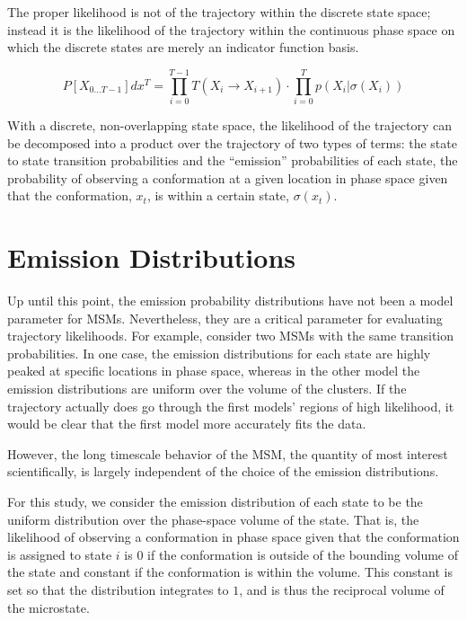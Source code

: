 \documentclass[twocolumn,floatfix,nofootinbib,aps]{revtex4-1}
\begin{document}
The proper likelihood is not of the trajectory within the discrete state
space; instead it is the likelihood of the trajectory within the
continuous phase space on which the discrete states are merely an
indicator function basis. 

\begin{equation}
P[X_{0...T-1}] dx^T = \prod_{i=0}^{T-1} T(X_i \rightarrow X_{i+1}) \cdot \prod_{i=0}^{T} p(X_{i} | \sigma(X_{i}))
\label{eq:like}
\end{equation}

With a discrete, non-overlapping state space, the likelihood of the
trajectory can be decomposed into a product over the trajectory of two
types of terms: the state to state transition probabilities and the
``emission'' probabilities of each state, the probability of observing a
conformation at a given location in phase space given that the
conformation, $x_t$, is within a certain state, $\sigma(x_t)$.

\section{Emission Distributions}

Up until this point, the emission probability distributions have not
been a model parameter for MSMs. Nevertheless, they are a critical
parameter for evaluating trajectory likelihoods. For example, consider two MSMs with the same transition probabilities. In one case, the emission distributions for each state are highly peaked at specific locations in phase space, whereas in the other model the emission distributions are uniform over the volume of the clusters. If the trajectory actually does go through the first models' regions of high likelihood, it would be clear that the first model more accurately fits the data.

However, the long timescale behavior of the MSM, the quantity of most
interest scientifically, is largely independent of the choice of the
emission distributions. %

For this study, we consider the emission distribution of each state to be the 
uniform distribution over the phase-space volume of the state. That is, the 
likelihood of observing a conformation in phase space given that the 
conformation is assigned to state $i$ is $0$ if the conformation is outside of 
the bounding volume of the state and constant if the conformation is within 
the volume. This constant is set so that the distribution integrates to $1$, 
and is thus the reciprocal volume of the microstate.
\end{document}
